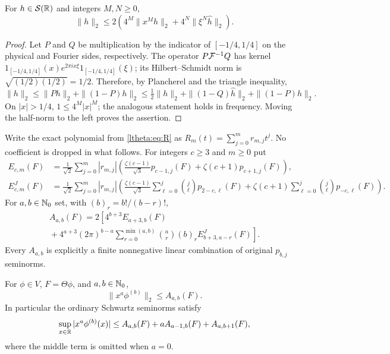 \documentclass[11pt]{article}
\begin{document}
\begin{lthetalemma}\label{ltheta:lem:uncertainty}
For $h\in\mathcal S(\mathbb R)$ and integers $M,N\geq0$,
\begin{equation}\label{ltheta:eq:uncertainty}
 \|h\|_2\leq2\left(4^M\|x^Mh\|_2
                         +4^N\|\xi^N\widehat h\|_2\right).
\end{equation}
\end{lthetalemma}

\begin{proof}
Let $P$ and $Q$ be multiplication by the indicator of $[-1/4,1/4]$
on the physical and Fourier sides, respectively. The operator
$P\mathcal F^{-1}Q$ has kernel $1_{[-1/4,1/4]}(x)
e^{2\pi i x\xi}1_{[-1/4,1/4]}(\xi)$; its Hilbert--Schmidt norm is
$\sqrt{(1/2)(1/2)}=1/2$. Therefore, by Plancherel and the triangle
inequality,
\[
 \|h\|_2\leq\|Ph\|_2+\|(1-P)h\|_2
 \leq\tfrac12\|h\|_2+\|(1-Q)\widehat h\|_2+\|(1-P)h\|_2.
\]
On $|x|>1/4$, $1\leq4^M|x|^M$; the analogous statement holds in
frequency. Moving the half-norm to the left proves the assertion.
\end{proof}

Write the exact polynomial from \eqref{ltheta:eq:R} as
$R_m(t)=\sum_{j=0}^m r_{m,j}t^j$. No coefficient is dropped in what
follows. For integers $c\geq3$ and $m\geq0$ put
\begin{align}
 E_{c,m}(F)&=\frac1{\sqrt2}\sum_{j=0}^m|r_{m,j}|
 \left(\frac{\zeta(c-1)}{\sqrt3}p_{c-1,j}(F)
                      +\zeta(c+1)p_{c+1,j}(F)\right),
                     \label{ltheta:eq:E}\\
 E^J_{c,m}(F)&=\frac1{\sqrt2}\sum_{j=0}^m|r_{m,j}|
 \left(\frac{\zeta(c-1)}{\sqrt3}
                     \sum_{\ell=0}^j\binom j\ell p_{2-c,\ell}(F)
       +\zeta(c+1)\sum_{\ell=0}^j\binom j\ell p_{-c,\ell}(F)\right).
                     \label{ltheta:eq:EJ}
\end{align}
For $a,b\in\mathbb N_0$ set, with $(b)_r=b!/(b-r)!$,
\begin{multline}\label{ltheta:eq:A}
 A_{a,b}(F)=2\left[4^{b+3}E_{a+3,b}(F)\right.\\
 \left.{}+4^{a+3}(2\pi)^{b-a}
 \sum_{r=0}^{\min(a,b)}\binom ar(b)_rE^J_{b+3,a-r}(F)\right].
\end{multline}
Every $A_{a,b}$ is explicitly a finite nonnegative linear combination
of original $p_{b,j}$ seminorms.

\begin{lthetaproposition}\label{ltheta:prop:inverse}
For $\phi\in V$, $F=\Theta\phi$, and $a,b\in\mathbb N_0$,
\begin{equation}\label{ltheta:eq:L2-inverse}
 \|x^a\phi^{(b)}\|_2\leq A_{a,b}(F).
\end{equation}
In particular the ordinary Schwartz seminorms satisfy
\begin{equation}\label{ltheta:eq:sup-inverse}
 \sup_{x\in\mathbb R}|x^a\phi^{(b)}(x)|
 \leq A_{a,b}(F)+aA_{a-1,b}(F)+A_{a,b+1}(F),
\end{equation}
where the middle term is omitted when $a=0$.
\end{lthetaproposition}
\end{document}
